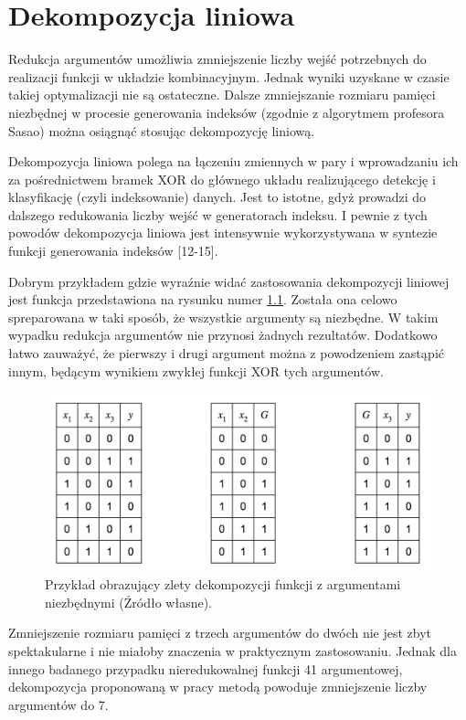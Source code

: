 \chapter{Dekompozycja liniowa}

Redukcja argumentów umożliwia zmniejszenie liczby wejść potrzebnych do realizacji funkcji w układzie kombinacyjnym.
Jednak wyniki uzyskane w czasie takiej optymalizacji nie są ostateczne.
Dalsze zmniejszanie rozmiaru pamięci niezbędnej w procesie generowania indeksów (zgodnie z algorytmem profesora Sasao) można osiągnąć stosując dekompozycję liniową.

Dekompozycja liniowa polega na  łączeniu zmiennych w pary i wprowadzaniu ich za pośrednictwem bramek XOR do głównego układu realizującego detekcję i klasyfikację (czyli indeksowanie) danych.
Jest to istotne,
gdyż prowadzi do dalszego redukowania liczby wejść w generatorach indeksu.
I pewnie z tych powodów dekompozycja liniowa jest intensywnie wykorzystywana w syntezie funkcji generowania indeksów [12-15].

Dobrym przykładem gdzie wyraźnie widać zastosowania dekompozycji liniowej jest funkcja przedstawiona na rysunku numer \ref{fig:required-decomposition}.
Została ona celowo spreparowana w taki sposób,
że wszystkie argumenty są niezbędne.
W takim wypadku redukcja argumentów nie przynosi żadnych rezultatów.
Dodatkowo łatwo zauważyć,
że pierwszy i drugi argument można z powodzeniem zastąpić innym,
będącym wynikiem zwykłej funkcji XOR tych argumentów.

\begin{figure}[H]
\centering
\includegraphics[width = 13cm]{chapter04/required-decomposition.png}
\caption{Przykład obrazujący zlety dekompozycji funkcji z argumentami niezbędnymi (Źródło własne).}
\label{fig:required-decomposition}
\end{figure}

Zmniejszenie rozmiaru pamięci z trzech argumentów do dwóch nie jest zbyt spektakularne i nie miałoby znaczenia w praktycznym zastosowaniu.
Jednak dla innego badanego przypadku nieredukowalnej funkcji 41 argumentowej,
dekompozycja proponowaną w pracy metodą powoduje zmniejszenie liczby argumentów do 7.

